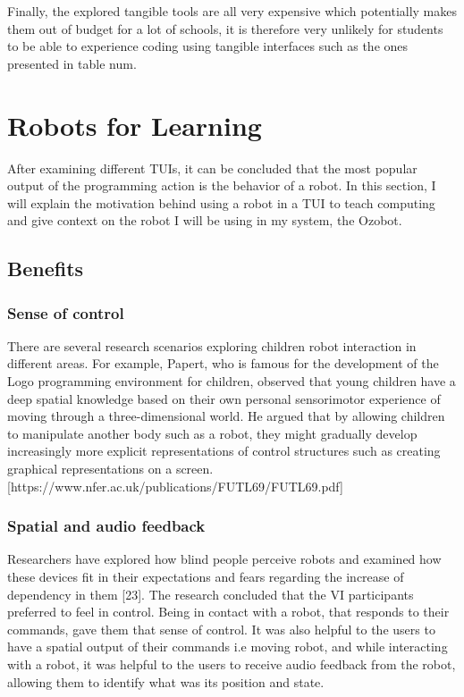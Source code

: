 \documentclass[oneside,%
                    author={Malak Hajji},
                    degree={BSc},
                    title={Designing An Accessible Computational Toolkit For Students},
                  subtitle={With Mixed Visual Abilities}]{dissertation}
\begin{document}
Finally, the explored tangible tools are all very expensive which potentially makes them out of budget for a lot of schools, it is therefore very unlikely for students to be able to experience coding using tangible interfaces such as the ones presented in table num.

\section{Robots for Learning}

After examining different TUIs, it can be concluded that the most popular output of the programming action is the behavior of a robot. In this section, I will explain the motivation behind using a robot in a TUI to teach computing and give context on the robot I will be using in my system, the Ozobot.

\subsection{Benefits}

\subsubsection{Sense of control}
There are several research scenarios exploring children robot interaction in different areas. For example, Papert, who is famous for the development of the Logo programming environment for children, observed that young children have a deep spatial knowledge based on their own personal sensorimotor experience of moving through a three-dimensional world. He argued that by allowing children to manipulate another body such as a robot, they might gradually develop increasingly more explicit representations of control structures such as creating graphical representations on a screen. [https://www.nfer.ac.uk/publications/FUTL69/FUTL69.pdf] 
\subsubsection{Spatial and audio feedback}
Researchers have explored how blind people perceive robots and examined how these devices fit in their expectations and fears regarding the increase of dependency in them [23]. The research concluded that the VI participants preferred to feel in control. Being in contact with a robot, that responds to their commands, gave them that sense of control. It was also helpful to the users to have a spatial output of their commands i.e moving robot, and while interacting with a robot, it was helpful to the users to receive audio feedback from the robot, allowing them to identify what was its position and state. 
\end{document}
